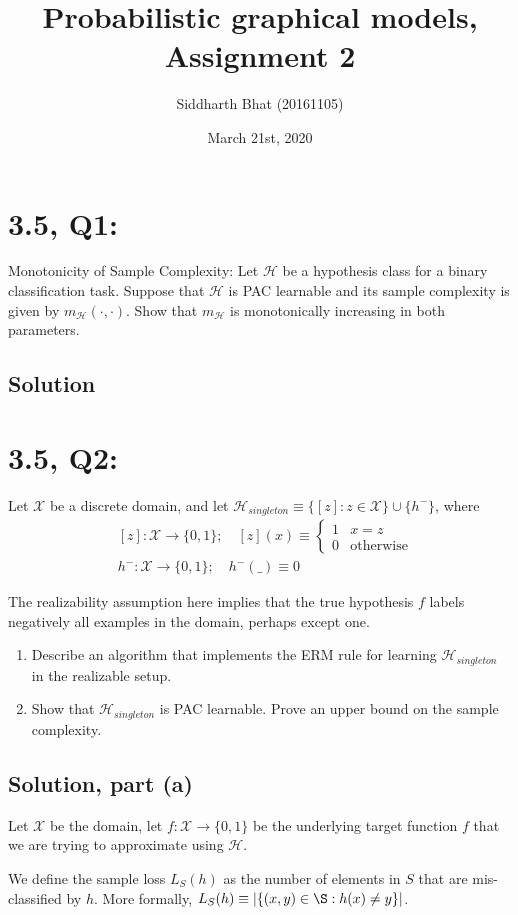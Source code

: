 \documentclass[11pt]{article}
\title{Probabilistic graphical models, Assignment 2}
\author{Siddharth Bhat (20161105)}
\date{March 21st, 2020}
\renewcommand{\H}{\ensuremath{\mathcal{H}}}
\newcommand{\X}{\ensuremath{\mathcal{X}}}
\begin{document}
\section*{3.5, Q1:}
Monotonicity of Sample Complexity: Let $\H$ be a hypothesis class for a
binary classification task. Suppose that $\H$ is PAC learnable and its sample
complexity is given by $m_\H (\cdot, \cdot)$. Show that $m_\H$ is monotonically
increasing in both parameters.
\subsection*{Solution}

\section*{3.5, Q2:} 
Let $\X$ be a discrete domain, and let 
$\H_{singleton} \equiv \{ [z] : z \in \X \} \cup \{h^− \}$, where
\begin{align*}
&[z]: \X \rightarrow \{0,1\};  \quad [z](x) \equiv \begin{cases} 1 & x = z \\ 0 & \text{otherwise} \end{cases}\\
&h^−: \X \rightarrow \{0, 1\}; \quad h^-(\_) \equiv 0
\end{align*}

The realizability assumption here implies that the true hypothesis $f$ labels
negatively all examples in the domain, perhaps except one.

\begin{enumerate}
    \item Describe an algorithm that implements the ERM rule for learning
        $\H_{singleton}$ in the realizable setup.
    \item Show that $\H_{singleton}$ is PAC learnable. Prove an upper
        bound on the sample complexity.
\end{enumerate}

\subsection*{Solution, part (a)}
Let $\X$ be the domain, let $f: \X \rightarrow \{0, 1\}$ be the underlying
target function $f$ that we are trying to approximate using $\H$.

We define the sample loss $L_S(h)$ as the number of elements in $S$
that are mis-classified by $h$. More formally,
$L_S(h) \equiv |\{ (x, y) \in \S : h(x) \neq  y \}|$.
\end{document}

